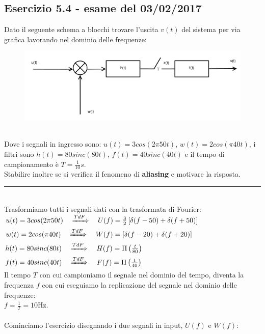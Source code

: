 \documentclass[12pt,a4paper]{article}
\begin{document}
	\subsection*{Esercizio 5.4 - esame del 03/02/2017} Dato il seguente schema a blocchi trovare l’uscita $v(t)$ del sistema per via grafica lavorando nel dominio delle frequenze:
	\begin{figure}[h!]
		\centering
		\includegraphics[scale=0.5]{./images/fourier54_1.png}
	\end{figure}
	\\Dove i segnali in ingresso sono: $u(t) = 3cos(2\pi 50t)$, $w(t) = 2cos(\pi 40t)$, i filtri sono $h(t) = 80sinc(80t)$, $f(t) = 40 sinc(40t)$ e il tempo di campionamento è $T = \frac{1}{10}s$.\\Stabilire inoltre se si verifica il fenomeno di \textbf{aliasing} e motivare la risposta.
	\vspace{5px}
	\par\noindent\rule{\textwidth}{0.4pt}
	\vspace{5px}
	\\
	Trasformiamo tutti i segnali dati con la trasformata di Fourier:\\
	$u(t) = 3cos(2\pi 50t)\quad\xRightarrow[]{TdF}\quad U(f) = \frac{3}{2}\left[\delta(f-50) + \delta(f+50)\right]$\\
	$w(t) = 2cos(\pi 40 t)\quad\xRightarrow[]{TdF}\quad W(f) = \left[\delta(f-20) + \delta(f+20)\right]$\\
	$h(t) = 80 sinc(80t)\quad\xRightarrow[]{TdF}\quad H(f) =
	\Pi\left(\frac{t}{80}\right)$\\$f(t) = 40 sinc(40t) \quad\xRightarrow[]{TdF}\quad  F(f) = \Pi\left(\frac{t}{40}\right)$\vspace{5px}\\
	Il tempo $T$ con cui campioniamo il segnale nel dominio del tempo, diventa la frequenza $f$ con cui eseguiamo la replicazione del segnale nel dominio delle frequenze:\\$f = \frac{1}{T} = 10$Hz.\\ \\
	Cominciamo l'esercizio disegnando i due segnali in input, $U(f)$ e $W(f)$:
\end{document}
